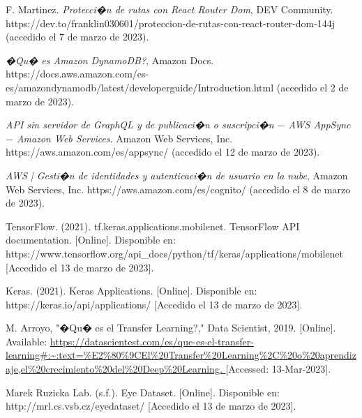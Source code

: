 \documentclass[12pt,letterpaper]{article}
\begin{document}
\begin{thebibliography}{10} %


F. Martinez. \emph{Protecci�n de rutas con React Router Dom}, DEV Community. https://dev.to/franklin030601/proteccion-de-rutas-con-react-router-dom-144j (accedido el 7 de marzo de 2023).

 \emph{�Qu� es Amazon DynamoDB?}, Amazon Docs. https://docs.aws.amazon.com/es-es/amazondynamodb/latest/developerguide/Introduction.html (accedido el 2 de marzo de 2023).

 \emph{API sin servidor de GraphQL y de publicaci�n o suscripci�n $-$ AWS AppSync $-$ Amazon Web Services}. Amazon Web Services, Inc. https://aws.amazon.com/es/appsync/ (accedido el 12 de marzo de 2023).  

 \emph{AWS | Gesti�n de identidades y autenticaci�n de usuario en la nube}, Amazon Web Services, Inc. https://aws.amazon.com/es/cognito/ (accedido el 8 de marzo de 2023).

 TensorFlow. (2021). tf.keras.applications.mobilenet. TensorFlow API documentation. [Online]. Disponible en: https://www.tensorflow.org/api\_docs/python/tf/keras/applications/mobilenet [Accedido el 13 de marzo de 2023].

 Keras. (2021). Keras Applications. [Online]. Disponible en: https://keras.io/api/applications/ [Accedido el 13 de marzo de 2023].

M. Arroyo, "�Qu� es el Transfer Learning?," Data Scientist, 2019. [Online]. Available: \url{ https://datascientest.com/es/que-es-el-transfer-learning#:~:text=%E2%80%9CEl%20Transfer%20Learning%2C%20o%20aprendizaje,el%20crecimiento%20del%20Deep%20Learning. }[Accessed: 13-Mar-2023].

 Marek Ruzicka Lab. (s.f.). Eye Dataset. [Online]. Disponible en: http://mrl.cs.vsb.cz/eyedataset/ [Accedido el 13 de marzo de 2023].


\end{thebibliography}
\end{document}
